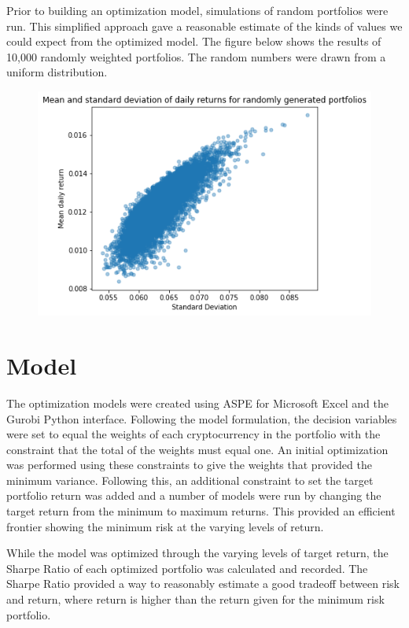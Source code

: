 \documentclass[12pt]{article} %
\begin{document}
Prior to building an optimization model, simulations of random portfolios were run. This simplified approach gave a reasonable estimate of the kinds of values we could expect from the optimized model. The figure below shows the results of 10,000 randomly weighted portfolios. The random numbers were drawn from a uniform distribution.


\begin{figure}[h]
\includegraphics{sim1}
\centering
\end{figure}
 
\section{Model}

The optimization models were created using ASPE for Microsoft Excel and the Gurobi Python interface. Following the model formulation, the decision variables were set to equal the weights of each cryptocurrency in the portfolio with the constraint that the total of the weights must equal one. An initial optimization was performed using these constraints to give the weights that provided the minimum variance. Following this, an additional constraint to set the target portfolio return was added and a number of models were run by changing the target return from the minimum to maximum returns. This provided an efficient frontier showing the minimum risk at the varying levels of return.

While the model was optimized through the varying levels of target return, the Sharpe Ratio of each optimized portfolio was calculated and recorded. The Sharpe Ratio provided a way to reasonably estimate a good tradeoff between risk and return, where return is higher than the return given for the minimum risk portfolio. 
\end{document}
